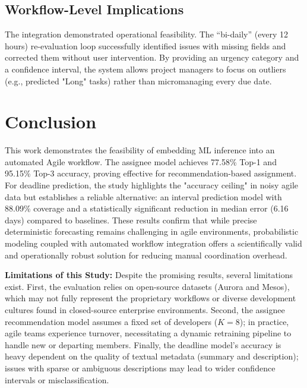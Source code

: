 \documentclass[conference]{IEEEtran}
\begin{document}
\subsection{Workflow-Level Implications}

The integration demonstrated operational feasibility. The ``bi-daily'' (every 12 hours) re-evaluation loop successfully identified issues with missing fields and corrected them without user intervention. By providing an urgency category and a confidence interval, the system allows project managers to focus on outliers (e.g., predicted "Long" tasks) rather than micromanaging every due date.

\section{Conclusion}

This work demonstrates the feasibility of embedding ML inference into an automated Agile workflow. The assignee model achieves 77.58\% Top-1 and 95.15\% Top-3 accuracy, proving effective for recommendation-based assignment. For deadline prediction, the study highlights the "accuracy ceiling" in noisy agile data but establishes a reliable alternative: an interval prediction model with 88.09\% coverage and a statistically significant reduction in median error (6.16 days) compared to baselines. These results confirm that while precise deterministic forecasting remains challenging in agile environments, probabilistic modeling coupled with automated workflow integration offers a scientifically valid and operationally robust solution for reducing manual coordination overhead.

\textbf{Limitations of this Study:} Despite the promising results, several limitations exist. First, the evaluation relies on open-source datasets (Aurora and Mesos), which may not fully represent the proprietary workflows or diverse development cultures found in closed-source enterprise environments. Second, the assignee recommendation model assumes a fixed set of developers ($K=8$); in practice, agile teams experience turnover, necessitating a dynamic retraining pipeline to handle new or departing members. Finally, the deadline model's accuracy is heavy dependent on the quality of textual metadata (summary and description); issues with sparse or ambiguous descriptions may lead to wider confidence intervals or misclassification.
\end{document}
